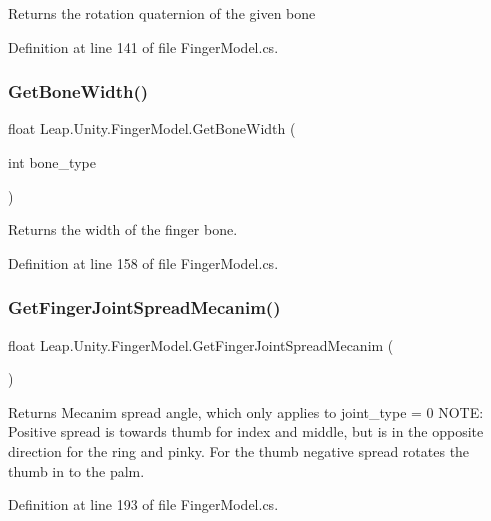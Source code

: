 Returns the rotation quaternion of the given bone 

Definition at line 141 of file Finger\+Model.\+cs.

\mbox{\label{class_leap_1_1_unity_1_1_finger_model_ae6f5843758fb9c6e1f08affba6b4be72}} 
\subsubsection{\texorpdfstring{GetBoneWidth()}{GetBoneWidth()}}
{\footnotesize\ttfamily float Leap.\+Unity.\+Finger\+Model.\+Get\+Bone\+Width (\begin{DoxyParamCaption}\item[{int}]{bone\+\_\+type }\end{DoxyParamCaption})}

Returns the width of the finger bone. 

Definition at line 158 of file Finger\+Model.\+cs.

\mbox{\label{class_leap_1_1_unity_1_1_finger_model_a6abf370a3ddeb4675801eeec6378a375}} 
\subsubsection{\texorpdfstring{GetFingerJointSpreadMecanim()}{GetFingerJointSpreadMecanim()}}
{\footnotesize\ttfamily float Leap.\+Unity.\+Finger\+Model.\+Get\+Finger\+Joint\+Spread\+Mecanim (\begin{DoxyParamCaption}{ }\end{DoxyParamCaption})}

Returns Mecanim spread angle, which only applies to joint\+\_\+type = 0 N\+O\+TE\+: Positive spread is towards thumb for index and middle, but is in the opposite direction for the ring and pinky. For the thumb negative spread rotates the thumb in to the palm. 

Definition at line 193 of file Finger\+Model.\+cs.

\mbox{\label{class_leap_1_1_unity_1_1_finger_model_a054cf50d19d911d50ddae0b0dcc40026}} 
